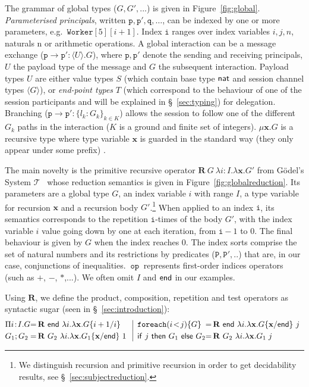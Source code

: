 \documentclass{LMCS}
\newcommand{\kf}[1]{\textup{\textsf{#1}}\xspace}
\newcommand{\participant}[1]{\ensuremath{\mathtt{#1}}}
\newcommand{\q}{\ensuremath{\participant{q}}}
\newcommand{\p}{\ensuremath{\participant{p}}}
\newcommand{\indexed}[4]{\ensuremath{\{#1_#3 : #2_#3\}_{#3 \in #4}}}
\newcommand{\RECSEQP}[4]{\ensuremath{\mathbf{R} \ #1\ \lambda #2.\lambda #3.#4}}
\newcommand{\sub}[2]{\ensuremath{\{#1/#2\}}}
\newcommand{\G}{\ensuremath{G}}
\newcommand{\U}{\ensuremath{U}}
\newcommand{\ST}{\ensuremath{S}}
\newcommand{\End}{\kf{end}}
\newcommand{\Nat}{\kf{nat}}
\newcommand{\ENCan}[1]{\langle #1 \rangle}
\newcommand{\TO}[2]{#1\to #2}
\newcommand{\GS}[3]{\TO{#1}{#2}\colon \!\ENCan{#3}}
\newcommand{\GB}[2]{\TO{#1}{#2}\colon\! \indexed{l}{\G}{k}{K}}
\newcommand{\GR}[4]{\RECSEQP{#1}{#2}{#3}{#4}}
\newcommand{\GM}[2]{\mu #1.#2}
\newcommand{\APP}{\;}
\newcommand{\mar}[1]{\ensuremath{\langle #1 \rangle}}
\newcommand{\IF}{\kf{if}}
\newcommand{\THEN}{\kf{then}}
\newcommand{\ELSE}{\kf{else}}
\newcommand{\ii}{\ensuremath{i}}
\newcommand{\jj}{\ensuremath{j}}
\newcommand{\n}{\ensuremath{\mathrm{n}}}
\newcommand{\nn}{\ensuremath{n}}
\newcommand{\xx}{\ensuremath{\mathbf{x}}}
\newcommand{\II}{\ensuremath{I}}
\newcommand{\Worker}{\ensuremath{\mathtt{Worker}}}
\newcommand{\op}{~\texttt{op}~}
\newcommand{\AT}[2]{#1\! : \! #2}
\newcommand{\tii}{\ensuremath{\mathtt{i}}}
\newcommand{\PRED}{\ensuremath{\mathtt{P}}}
\newcommand{\eg}{e.g.~}
\newcommand{\MERGE}[1]{\ensuremath{#1}}
\newcommand{\FOREACH}[3]{\ensuremath{\mathtt{foreach}(#1 #2)\{#3\}}}
\begin{document}
 

The grammar of global types ($G,G',...$) is given in Figure~\ref{fig:global}.
{\em Parameterised principals}, written $\p,\p',\q,\ldots$, can be indexed by one or more parameters, \eg $\Worker[5][\ii+1]$. Index
$\tii$ ranges over index variables $\ii,\jj,\nn$, naturals $\n$ or
arithmetic operations.  A global interaction can be a message exchange
($\GS{\p}{\p'}{\U}.\G$), where $\p,\p'$ denote the sending and receiving
principals, $\U$ the payload type of the message and $\G$ the subsequent
interaction.  Payload types $\U$ are either value types $\ST$ (which contain
base type $\Nat$ and session channel types $\mar{G}$), or 
{\em end-point types} $T$
(which correspond to the behaviour of one of the session participants and will
be explained in \S~\ref{sec:typing}) for
delegation. Branching ($\GB{\p}{\p'}$) allows the session to follow one of the different $\G_k$
paths in the interaction ($K$ is a ground and finite set of integers). 
$\GM{\xx}{\G}$ is a recursive type where   
type variable $\xx$ 
is guarded in the standard way 
(they only appear under some prefix)
 \cite{PierceBC:typsysfpl}.

The main novelty is the primitive recursive operator
$\GR{\G}{\AT{\ii}{\II}}{\xx}{\G'}$ from G\"odel's System
$\mathcal{T}$~\cite{GirardJY:protyp} 
whose reduction semantics is given in Figure~\ref{fig:globalreduction}.  
Its parameters are a global type $\G$, an index variable
$\ii$ with range $\II$,
 a type variable for recursion $\xx$ and a recursion body
$\G'$.\footnote{We distinguish recursion and primitive recursion in order to get
  decidability results, see \S~\ref{sec:subjectreduction}. } 
When applied to an index $\tii$, its semantics corresponds to the
repetition $\tii$-times of the body $\G'$, with the index variable $\ii$ value
going down by one at each iteration, from $\tii-1$ to $0$. The final
behaviour is 
given by $\G$ when the index reaches $0$. 
The index sorts comprise the set of natural numbers and its restrictions by predicates ($\PRED,\PRED',..$) that are, in our case, conjunctions of inequalities.  $\op$ represents first-order indices operators
(such as $+$, $-$, $\ast$,...). 
We often omit $\II$ and $\End$ in our examples. 

Using $\mathbf{R}$, we define the product, composition, repetition and test
operators as syntactic sugar (seen in \S~\ref{sec:introduction}):
{\footnotesize
\[
\begin{array}{@{}l@{}c@{\,}l|@{\;\;}l@{}c@{\,}l}
\Pi \AT{\ii}{\II}.\G & = & \GR{\End}{\ii}{\xx}{\G\sub{\ii+1}{\ii}}
& \FOREACH{\ii}{\!<\!\jj}{G}& = &
 \GR{\End}{\ii}{\xx}{\G\sub{\xx}{\End}} \ \jj\\[1mm]
\MERGE{G_1;G_2} & = &
\GR{\G_2}{\ii}{\xx}{\G_1\sub{\xx}{\End}} \ 1 \ 
& \IF\ \jj \ \THEN\ \G_1 \ \ELSE \ \G_2 & = &
\GR{\G_2}{\ii}{\xx}{\G_1}\APP \jj
\end{array}
\]}
\end{document}
